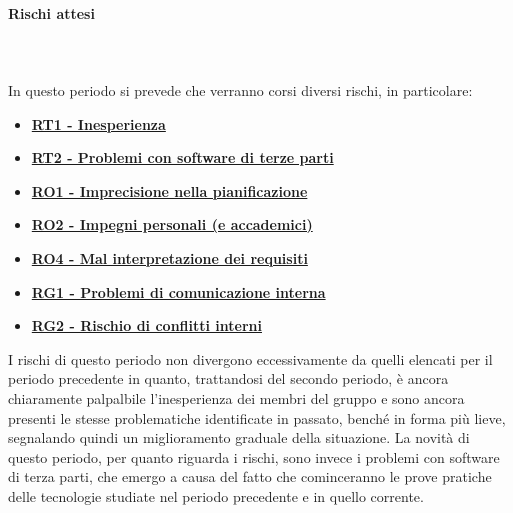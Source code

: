 \paragraph{Rischi attesi} \hspace{1cm}
\\ \hspace{1cm} \\
In questo periodo si prevede che verranno corsi diversi rischi, in particolare:
\begin{itemize}
    \item \textbf{\hyperlink{RT1}{RT1 - Inesperienza}}
    \item \textbf{\hyperlink{RT2}{RT2 - Problemi con software di terze parti}}
    \item \textbf{\hyperlink{RO1}{RO1 - Imprecisione nella pianificazione}}
    \item \textbf{\hyperlink{RO2}{RO2 - Impegni personali (e accademici)}}
    \item \textbf{\hyperlink{RO4}{RO4 - Mal interpretazione dei requisiti}}
    \item \textbf{\hyperlink{RG1}{RG1 - Problemi di comunicazione interna}}
    \item \textbf{\hyperlink{RG2}{RG2 - Rischio di conflitti interni}}
\end{itemize}
I rischi di questo periodo non divergono eccessivamente da quelli elencati per il periodo precedente in quanto, trattandosi del secondo periodo, è ancora chiaramente palpalbile l'inesperienza dei membri del gruppo e sono ancora presenti le stesse problematiche identificate in passato, benché in forma più lieve, segnalando quindi un miglioramento graduale della situazione. 
La novità di questo periodo, per quanto riguarda i rischi, sono invece i problemi con software di terza parti, che emergo a causa del fatto che cominceranno le prove pratiche delle tecnologie studiate nel periodo precedente e in quello corrente.
